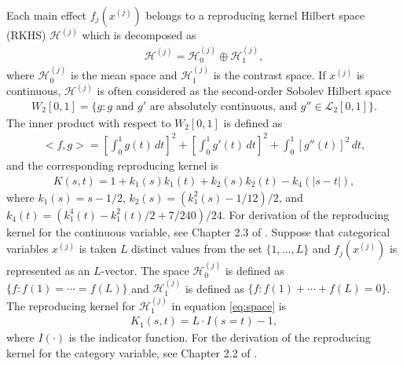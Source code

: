 Each main effect \(f_j(x^{(j)})\) belongs to a reproducing kernel Hilbert space (RKHS) \(\mathcal{H}^{(j)}\) which is decomposed as
\begin{align}
    \mathcal{H}^{(j)} = \mathcal{H}_0^{(j)} \oplus \mathcal{H}_1^{(j)},
    \label{eq:space} 
\end{align}
where \(\mathcal{H}_0^{(j)}\) is the mean space and \(\mathcal{H}_1^{(j)}\) is the contrast space. If \(x^{(j)}\) is continuous, \(\mathcal{H}^{(j)}\) is often considered as the second-order Sobolev Hilbert space
\begin{align*}
    W_2[0,1] = \{ g : g \text{ and } g' \text{ are absolutely continuous, and } g'' \in \mathcal{L}_2[0,1] \}.
\end{align*}
The inner product with respect to \(W_2[0,1]\) is defined as
\begin{align*}
    <f,g> = \left[ \int_{0}^{1} g(t) \, dt \right]^2 + \left[ \int_{0}^{1} g'(t) \, dt \right]^2 + \int_{0}^{1} [g''(t)]^2 \, dt,
\end{align*}
and the corresponding reproducing kernel is
\begin{align*}
    K(s,t) = 1 + k_1(s) k_1(t) + k_2(s) k_2(t) - k_4(|s-t|),
\end{align*}
where \(k_1(s) = s - 1/2\), \(k_2(s) = (k_1^2(s) - 1/12)/2\), and \(k_4(t) = (k_1^4(t) - k_1^2(t)/2 + 7/240)/24\). For derivation of the reproducing kernel for the continuous variable, see Chapter 2.3 of \citet{Gu:2013}.
Suppose that categorical variables \(x^{(j)}\) is taken \(L\) distinct values from the set \(\{1, \dots ,L\}\) and \(f_j(x^{(j)})\) is represented as an \(L\)-vector. The space \(\mathcal{H}_0^{(j)}\) is defined as \(\{f : f(1) = \cdots = f(L)\}\) and \(\mathcal{H}_1^{(j)}\) is defined as \(\{f : f(1) + \cdots + f(L) = 0\}\). The reproducing kernel for \(\mathcal{H}_1^{(j)}\) in equation \eqref{eq:space} is
\begin{align*}
    K_1(s,t) = L \cdot I(s = t) - 1,
\end{align*}
where \(I(\cdot)\) is the indicator function. For the derivation of the reproducing kernel for the category variable, see Chapter 2.2 of \citet{Gu:2013}.

